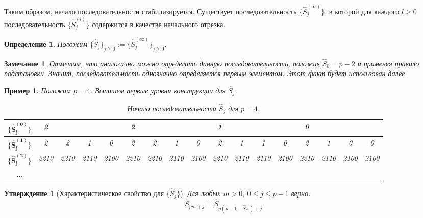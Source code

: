 \documentclass[14pt, a4paper, russian]{report}
\newtheorem{remark}{\indent Замечание}
\newtheorem{definition}{\indent Определение}
\newtheorem{proposition}{\indent Утверждение}
\newtheorem{example}{\indent Пример}
\begin{document}
Таким образом, начало последовательности стабилизируется. Существует последовательность $\{ \hat{S}_j^{(\infty)}\}$, в которой для каждого $l \ge 0$ последовательность $\{ \hat{S}_j^{(l)}\}$ содержится в качестве начального отрезка.
\begin{definition}
Положим $\{\hat{S}_j\}_{j \ge 0} := \{ \hat{S}_j^{(\infty)}\}_{j \ge 0}$.
\end{definition}

\begin{remark}
Отметим, что аналогично можно определить данную последовательность, положив $\hat{S}_0 = p-2$ и применяя правило подстановки. Значит, последовательность однозначно определяется первым элементом. Этот факт будет использован далее.
\end{remark}
\begin{example}
Положим $p=4$. Выпишем первые уровни конструкции для $\hat{S}_j$.


\begin{table}[H]\label{table:Sj}
\begin{footnotesize}
\begin{center}
\begin{tabular}{|c|cccc|cccc|cccc|cccc|}
\hline
$\{ \mathbf{\hat{S}_j^{(0)}}\}$ & 2 & & & & 2 & & & & 1 & & & & 0 & & & \\
\hline
$\{ \mathbf{\hat{S}_j^{(1)}}\}$ & 2 & 2 & 1 & 0 & 2 & 2 & 1 & 0 & 2 & 1 & 1 & 0 & 2 & 1 & 0 & 0 \\
\hline

$\{ \mathbf{\hat{S}_j^{(2)}}\}$ &
\tiny{2210} & \tiny{2210} & \tiny{2110} & \tiny{2100} &
\tiny{2210} & \tiny{2210} & \tiny{2110} & \tiny{2100} &
\tiny{2210} & \tiny{2110} & \tiny{2110} & \tiny{2100} &
\tiny{2210} & \tiny{2110} & \tiny{2100} & \tiny{2100} \\

\hline
 $\mathbf{\ldots}$ & & & & & & & & & & & & & & & & \\
\hline
\end{tabular}
\end{center}
\end{footnotesize}
\caption{Начало последовательности $\hat{S}_j$ для $p=4$.}
\end{table}
\end{example}
\begin{proposition}[Характеристическое свойство для $\{\hat{S}_j\}$]\label{charProp}
Для любых $m > 0,\ 0 \le j \le p-1$ верно: 
\begin{equation}\label{eq:charProp}
\hat{S}_{pm+j}=\hat{S}_{p(p-1-\hat{S}_m) + j}
\end{equation}
\end{proposition}
\end{document}
